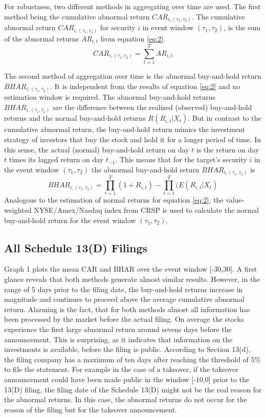 \documentclass[12pt]{article}
\begin{document}
For robustness, two different methods in aggregating over time are used. The first method being the cumulative abnormal return $CAR_{i,(\tau_1,\tau_2)}$. The cumulative abnormal return $CAR_{i,(\tau_1,\tau_2)}$ for security $i$ in event window $(\tau_1,\tau_2)$, is the sum of the abnormal returns $AR_{i,t}$ from equation \eqref{eq:2}.
	\begin{equation}
		CAR_{i,(\tau_1,\tau_2)}=\sum_{t=1}^{T}AR_{i,t}
	\end{equation}
\pagebreak

The second method of aggregation over time is the abnormal buy-and-hold return $BHAR_{i,(\tau_1,\tau_2)}$. It is independent from the results of equation \eqref{eq:2} and no estimation window is required. 
The abnormal buy-and-hold returns $BHAR_{i,(\tau_1,\tau_2)}$ are the difference between the realized (observed) buy-and-hold returns and the normal buy-and-hold returns $R(R_{i,t}|X_{t})$.
But in contrast to the cumulative abnormal return, the buy-and-hold return mimics the investment strategy of investors that buy the stock and hold it for a longer period of time. In this sense, the actual (normal) buy-and-hold return on day $t$ is the return on day $t$ times its lagged return on day $t_{-1}$. This means that for the target's security $i$ in the event window $(\tau_1,\tau_2)$ the abnormal buy-and-hold return $BHAR_{i,(\tau_1,\tau_2)}$ is
\begin{equation}
	BHAR_{i,(\tau_1,\tau_2)}=\prod_{t=1}^{T}(1+R_{i,t})-\prod_{t=1}^{T}(E(R_{i,t}|X_{t})
\end{equation}
Analogous to the estimation of normal returns for equation \eqref{eq:2}, the value-weighted NYSE/Amex/Nasdaq index from CRSP is used to calculate the normal buy-and-hold return for the event window $(\tau_1,\tau_2)$.

\subsection{All Schedule 13(D) Filings}

Graph 1 plots the mean CAR and BHAR over the event window [-30,30]. A first glance reveals that both methods generate almost similar results. However, in the range of 5 days prior to the filing date, the buy-and-hold returns increase in magnitude and continues to proceed above the average cumulative abnormal return. Alarming is the fact, that for both methods almost all information has been processed by the market before the actual filing. On average the stocks experience the first large abnormal return around sevens days before the announcement. This is surprising, as it indicates that information on the investments is available, before the filing is public. According to Section 13(d), the filing company has a maximum of ten days after reaching the threshold of 5\% to file the statement. For example in the case of a takeover, if the takeover announcement could have been made public in the window [-10,0] prior to the 13(D) filing, the filing date of the Schedule 13(D) might not be the real reason for the abnormal returns. In this case, the abnormal returns do not occur for the reason of the filing but for the takeover announcement. 
\end{document}
